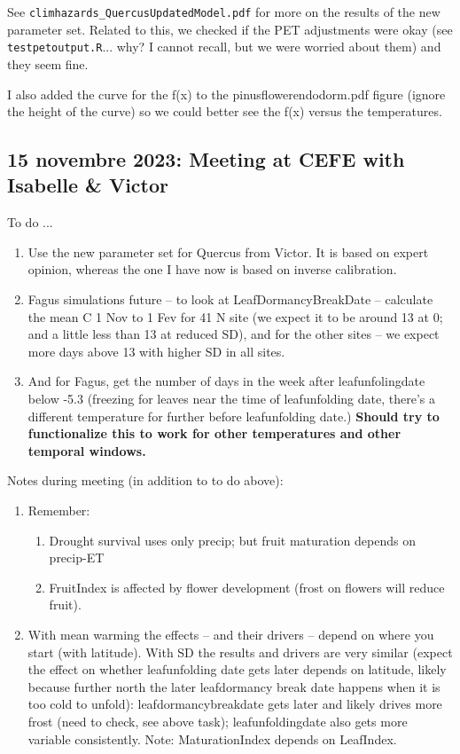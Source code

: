\documentclass[11pt,letter]{article}
\begin{document}
See \verb|climhazards_QuercusUpdatedModel.pdf| for more on the results of the new parameter set. Related to this, we checked if the PET adjustments were okay (see \verb|testpetoutput.R|... why? I cannot recall, but we were worried about them) and they seem fine. 

I also added the curve for the f(x) to the pinusflowerendodorm.pdf figure (ignore the height of the curve) so we could better see the f(x) versus the temperatures. 


\subsection{15 novembre 2023: Meeting at CEFE with Isabelle \& Victor}

To do ...
\begin{enumerate}
\item Use the new parameter set for Quercus from Victor. It is based on expert opinion, whereas the one I have now is based on inverse calibration. 
\item Fagus simulations future -- to look at LeafDormancyBreakDate -- calculate the mean C 1 Nov to 1 Fev for 41 N site (we expect it to be around 13 at 0; and a little less than 13 at reduced SD), and for the other sites -- we expect more days above 13 with higher SD in all sites. 
\item And for Fagus, get the number of days in the week after leafunfolingdate below -5.3  (freezing for leaves near the time of leafunfolding date, there's a different temperature for further before leafunfolding date.) {\bf Should try to functionalize this to work for other temperatures and other temporal windows.} %
\end{enumerate}

Notes during meeting (in addition to to do above):
\begin{enumerate}
\item Remember:
\begin{enumerate}
\item Drought survival uses only precip; but fruit maturation depends on precip-ET
\item FruitIndex is affected by flower development (frost on flowers will reduce fruit). 
\end{enumerate}
\item With mean warming the effects -- and their drivers -- depend on where you start (with latitude). With SD the results and drivers are very similar (expect the effect on whether leafunfolding date gets later depends on latitude, likely because further north the later leafdormancy break date happens when it is too cold to unfold): leafdormancybreakdate gets later and likely drives more frost (need to check, see above task); leafunfoldingdate also gets more variable consistently. Note: MaturationIndex depends on LeafIndex. 
\end{enumerate}
\end{document}
